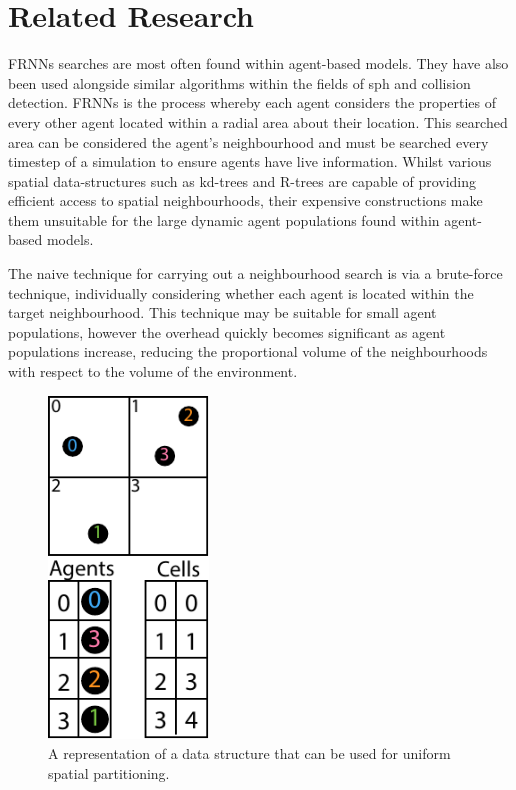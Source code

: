 \vspace{-0.3cm}
\section{Related Research\label{sec:related-work}}
\vspace{-0.4cm}
  FRNNs searches are most often found within agent-based models. They have also been used alongside similar algorithms within the fields of \gls{sph} and collision detection. FRNNs is the process whereby each agent considers the properties of every other agent located within a radial area about their location. This searched area can be considered the agent’s neighbourhood and must be searched every timestep of a simulation to ensure agents have live information. Whilst various spatial data-structures such as kd-trees and R-trees are capable of providing efficient access to spatial neighbourhoods, their expensive constructions make them unsuitable for the large dynamic agent populations found within agent-based models.

  The naive technique for carrying out a neighbourhood search is via a brute-force technique, individually considering whether each agent is located within the target neighbourhood. This technique may be suitable for small agent populations, however the overhead quickly becomes significant as agent populations increase, reducing the proportional volume of the neighbourhoods with respect to the volume of the environment.
  
\begin{figure}
  \begin{center}
    \includegraphics[width=0.38\textwidth]{../resources/usp/usp.pdf}
  \end{center}
  \caption{\label{fig:usp} A representation of a data structure that can be used for uniform spatial partitioning.}
\end{figure}
  
